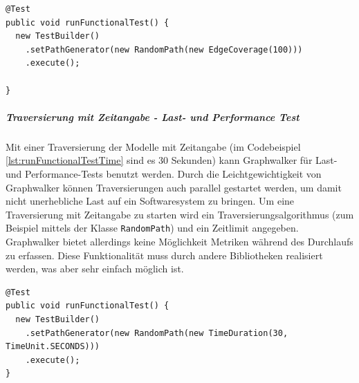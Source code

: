 \begin{lstlisting}[caption={Eine randomisierte aber vollständige Traversierung des Modells in Graphwalker.}, label=lst:runFunctionalTest]
@Test
public void runFunctionalTest() {
  new TestBuilder()
    .setPathGenerator(new RandomPath(new EdgeCoverage(100)))
    .execute();
    
}
\end{lstlisting}


\subparagraph{Traversierung mit Zeitangabe - Last- und Performance Test}
Mit einer Traversierung der Modelle mit Zeitangabe (im Codebeispiel \ref{lst:runFunctionalTestTime} sind es 30 Sekunden) kann Graphwalker für Last- und Performance-Tests benutzt werden. Durch die Leichtgewichtigkeit von Graphwalker können Traversierungen auch parallel gestartet werden, um damit nicht unerhebliche Last auf ein Softwaresystem zu bringen. Um eine Traversierung mit Zeitangabe zu starten wird ein Traversierungsalgorithmus (zum Beispiel mittels der Klasse \texttt{RandomPath}) und ein Zeitlimit angegeben.\\
Graphwalker bietet allerdings keine Möglichkeit Metriken während des Durchlaufs zu erfassen. Diese Funktionalität muss durch andere Bibliotheken realisiert werden, was aber sehr einfach möglich ist.

\begin{lstlisting}[caption={Ein Graphwalker Test wird angestoßen, der das Modell 30 Sekunden lang zufällig traversiert.}, label=lst:runFunctionalTestTime]
@Test
public void runFunctionalTest() {  
  new TestBuilder()
    .setPathGenerator(new RandomPath(new TimeDuration(30, TimeUnit.SECONDS)))
    .execute();
}
\end{lstlisting}


